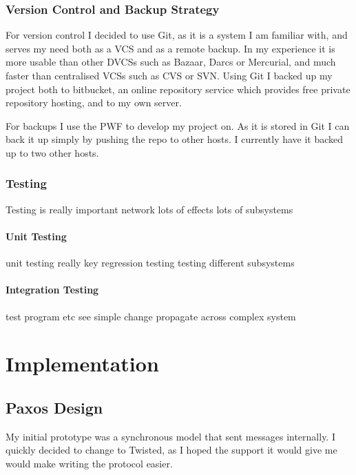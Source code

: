 \documentclass[12pt,twoside,notitlepage]{report}
\begin{document}
\subsection{Version Control and Backup Strategy}

For version control I decided to use Git, as it is a system I am familiar with, and serves my need
both as a VCS and as a remote backup. In my experience it is more usable than other DVCSs such as
Bazaar, Darcs or Mercurial, and much faster than centralised VCSs such as CVS or SVN. Using Git I
backed up my project both to bitbucket, an online repository service which provides free private
repository hosting, and to my own server.

For backups I use the PWF to develop my project on. As it is stored in Git I can back it up simply
by pushing the repo to other hosts. I currently have it backed up to two other hosts.

\subsection{Testing}

Testing is really important
network
lots of effects
lots of subsystems

\subsubsection{Unit Testing}

unit testing really key
regression testing
testing different subsystems

\subsubsection{Integration Testing}

test program etc
see simple change propagate across complex system



\cleardoublepage
\chapter{Implementation}

\section{Paxos Design}

My initial prototype was a synchronous model that sent messages internally. I quickly decided to
change to Twisted, as I hoped the support it would give me would make writing the protocol easier.
\end{document}
